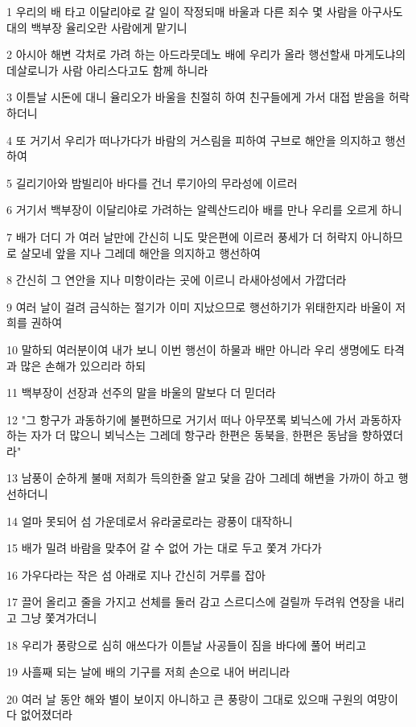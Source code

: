 \par 1 우리의 배 타고 이달리야로 갈 일이 작정되매 바울과 다른 죄수 몇 사람을 아구사도대의 백부장 율리오란 사람에게 맡기니
\par 2 아시아 해변 각처로 가려 하는 아드라뭇데노 배에 우리가 올라 행선할새 마게도냐의 데살로니가 사람 아리스다고도 함께 하니라
\par 3 이튿날 시돈에 대니 율리오가 바울을 친절히 하여 친구들에게 가서 대접 받음을 허락하더니
\par 4 또 거기서 우리가 떠나가다가 바람의 거스림을 피하여 구브로 해안을 의지하고 행선하여
\par 5 길리기아와 밤빌리아 바다를 건너 루기아의 무라성에 이르러
\par 6 거기서 백부장이 이달리야로 가려하는 알렉산드리아 배를 만나 우리를 오르게 하니
\par 7 배가 더디 가 여러 날만에 간신히 니도 맞은편에 이르러 풍세가 더 허락지 아니하므로 살모네 앞을 지나 그레데 해안을 의지하고 행선하여
\par 8 간신히 그 연안을 지나 미항이라는 곳에 이르니 라새아성에서 가깝더라
\par 9 여러 날이 걸려 금식하는 절기가 이미 지났으므로 행선하기가 위태한지라 바울이 저희를 권하여
\par 10 말하되 여러분이여 내가 보니 이번 행선이 하물과 배만 아니라 우리 생명에도 타격과 많은 손해가 있으리라 하되
\par 11 백부장이 선장과 선주의 말을 바울의 말보다 더 믿더라
\par 12 "그 항구가 과동하기에 불편하므로 거기서 떠나 아무쪼록 뵈닉스에 가서 과동하자 하는 자가 더 많으니 뵈닉스는 그레데 항구라 한편은 동북을, 한편은 동남을 향하였더라"
\par 13 남풍이 순하게 불매 저희가 득의한줄 알고 닻을 감아 그레데 해변을 가까이 하고 행선하더니
\par 14 얼마 못되어 섬 가운데로서 유라굴로라는 광풍이 대작하니
\par 15 배가 밀려 바람을 맞추어 갈 수 없어 가는 대로 두고 쫓겨 가다가
\par 16 가우다라는 작은 섬 아래로 지나 간신히 거루를 잡아
\par 17 끌어 올리고 줄을 가지고 선체를 둘러 감고 스르디스에 걸릴까 두려워 연장을 내리고 그냥 쫓겨가더니
\par 18 우리가 풍랑으로 심히 애쓰다가 이튿날 사공들이 짐을 바다에 풀어 버리고
\par 19 사흘째 되는 날에 배의 기구를 저희 손으로 내어 버리니라
\par 20 여러 날 동안 해와 별이 보이지 아니하고 큰 풍랑이 그대로 있으매 구원의 여망이 다 없어졌더라
